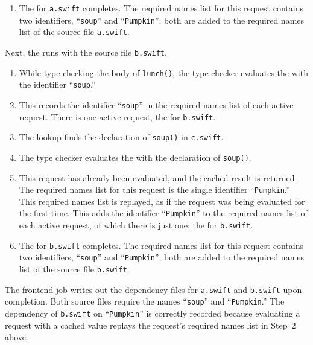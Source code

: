 \documentclass[../generics]{subfiles}
\begin{document}
\begin{example}
\begin{enumerate}
\item The  for \texttt{a.swift} completes. The required names list for this request contains two identifiers, ``\texttt{soup}'' and ``\texttt{Pumpkin}''; both are added to the required names list of the source file \texttt{a.swift}.
\end{enumerate}
Next, the  runs with the source file \texttt{b.swift}.
\begin{enumerate}
\item While type checking the body of \texttt{lunch()}, the type checker evaluates the  with the identifier ``\texttt{soup}.''
\item This records the identifier ``\texttt{soup}'' in the required names list of each active request. There is one active request, the  for \texttt{b.swift}.
\item The lookup finds the declaration of \texttt{soup()} in \texttt{c.swift}.
\item The type checker evaluates the  with the declaration of \texttt{soup()}.
\item This request has already been evaluated, and the cached result is returned. The required names list for this request is the single identifier ``\texttt{Pumpkin}.'' This required names list is replayed, as if the request was being evaluated for the first time. This adds the identifier ``\texttt{Pumpkin}'' to the required names list of each active request, of which there is just one: the  for \texttt{b.swift}.
\item The  for \texttt{b.swift} completes. The required names list for this request contains two identifiers, ``\texttt{soup}'' and ``\texttt{Pumpkin}''; both are added to the required names list of the source file \texttt{b.swift}.
\end{enumerate}

The frontend job writes out the dependency files for \texttt{a.swift} and \texttt{b.swift} upon completion. Both source files require the names ``\texttt{soup}'' and ``\texttt{Pumpkin}.'' The dependency of \texttt{b.swift} on ``\texttt{Pumpkin}'' is correctly recorded because evaluating a request with a cached value replays the request's required names list in Step~2 above.
\end{example}
\end{document}
